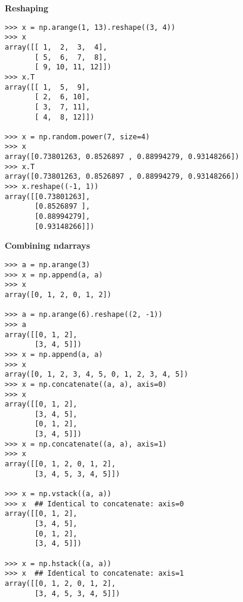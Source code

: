 \documentclass[oneside]{scrbook}
\begin{document}
\noindent
\textbf{Reshaping}
\begin{verbatim}
>>> x = np.arange(1, 13).reshape((3, 4))
>>> x
array([[ 1,  2,  3,  4],
       [ 5,  6,  7,  8],
       [ 9, 10, 11, 12]])
>>> x.T
array([[ 1,  5,  9],
       [ 2,  6, 10],
       [ 3,  7, 11],
       [ 4,  8, 12]])

>>> x = np.random.power(7, size=4)
>>> x
array([0.73801263, 0.8526897 , 0.88994279, 0.93148266])
>>> x.T
array([0.73801263, 0.8526897 , 0.88994279, 0.93148266])
>>> x.reshape((-1, 1))
array([[0.73801263],
       [0.8526897 ],
       [0.88994279],
       [0.93148266]])
\end{verbatim}


\noindent
\textbf{Combining ndarrays}
\begin{verbatim}
>>> a = np.arange(3)
>>> x = np.append(a, a)
>>> x
array([0, 1, 2, 0, 1, 2])

>>> a = np.arange(6).reshape((2, -1))
>>> a
array([[0, 1, 2],
       [3, 4, 5]])
>>> x = np.append(a, a)
>>> x
array([0, 1, 2, 3, 4, 5, 0, 1, 2, 3, 4, 5])
>>> x = np.concatenate((a, a), axis=0)
>>> x
array([[0, 1, 2],
       [3, 4, 5],
       [0, 1, 2],
       [3, 4, 5]])
>>> x = np.concatenate((a, a), axis=1)
>>> x
array([[0, 1, 2, 0, 1, 2],
       [3, 4, 5, 3, 4, 5]])

>>> x = np.vstack((a, a))
>>> x  ## Identical to concatenate: axis=0
array([[0, 1, 2],
       [3, 4, 5],
       [0, 1, 2],
       [3, 4, 5]])

>>> x = np.hstack((a, a))
>>> x  ## Identical to concatenate: axis=1
array([[0, 1, 2, 0, 1, 2],
       [3, 4, 5, 3, 4, 5]])

\end{verbatim}
\end{document}
